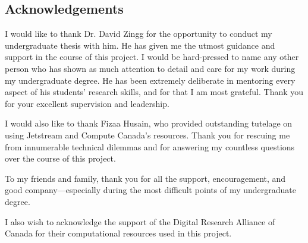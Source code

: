 \thispagestyle{plain}
\begin{center}
  \section*{Acknowledgements}
\end{center}
\begingroup
I would like to thank Dr. David Zingg for the opportunity to conduct my undergraduate thesis with him. He has given me the utmost guidance and support in the course of this project. I would be hard-pressed to name any other person who has shown as much attention to detail and care for my work during my undergraduate degree. He has been extremely deliberate in mentoring every aspect of his students' research skills, and for that I am most grateful. Thank you for your excellent supervision and leadership.\par
I would also like to thank Fizaa Husain, who provided outstanding tutelage on using Jetstream and Compute Canada's resources. Thank you for rescuing me from innumerable technical dilemmas and for answering my countless questions over the course of this project.\par
To my friends and family, thank you for all the support, encouragement, and good company—especially during the most difficult points of my undergraduate degree.\par
I also wish to acknowledge the support of the Digital Research Alliance of Canada for their computational resources used in this project.
\par
\endgroup
\cleardoublepage